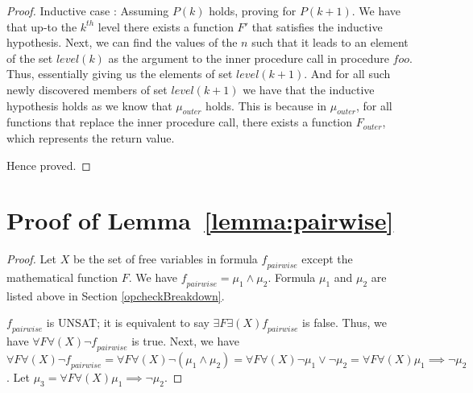 \documentclass{llncs}
\newcommand{\foo}{\textit{foo}}
\newcommand{\F}{\mathit{F}}
\newcommand{\n}{\textit{n}}
\newcommand{\formula}{\mu}
\newcommand{\pairFormula}{\mathit{f_{pairwise}}}
\newcommand{\level}[1]{\mathit{level(#1)}}
\begin{document}
\begin{subappendices}
\begin{proof}
Inductive case : Assuming $P(k)$ holds, proving for $P(k+1)$. We have
that up-to the $k^{th}$ level there exists a function $\F'$ that
satisfies the inductive hypothesis. Next, we can find the values of
the $\n$ such that it leads to an element of the set $\level{k}$ as
the argument to the inner procedure call in procedure $\foo$. Thus,
essentially giving us the elements of set $\level{k+1}$.  And for all
such newly discovered members of set $\level{k+1}$ we have that the
inductive hypothesis holds as we know that $\formula_{outer}$
holds. This is because in $\formula_{outer}$, for all functions that
replace the inner procedure call, there exists a function
$\F_{outer}$, which represents the return value.


  
Hence proved.
\end{proof}

\section{Proof of Lemma~\ref{lemma:pairwise}}

\begin{proof}
  Let $X$ be the set of free variables in formula
  $\pairFormula$ except the mathematical function $\F$. We have
  $\pairFormula = \formula_1 \wedge \formula_2$. Formula
  $\formula_1$ and $\formula_2$ are listed above in Section
  \ref{opcheckBreakdown}.
  
  $\pairFormula$ is UNSAT; it is equivalent to say $\exists \F
  \exists(X) \pairFormula$ is false. Thus, we have $\forall \F
  \forall (X) \neg \pairFormula$ is true. Next, we have $\forall \F
  \forall (X) \neg \pairFormula = \forall \F \forall (X) \neg(
  \formula_1 \wedge \formula_2) = \forall \F \forall (X) \neg
  \formula_1 \vee \neg \formula_2 = \forall \F \forall (X) \formula_1
  \implies \neg \formula_2$. Let $\formula_3 = \forall \F \forall (X)
  \formula_1 \implies \neg \formula_2$.


\end{proof}
\end{subappendices}
\end{document}

